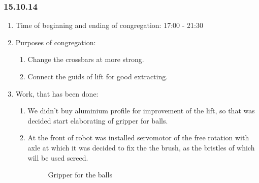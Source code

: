 
\subsubsection{15.10.14}

\begin{enumerate}
	\item Time of beginning and ending of congregation:
	17:00 - 21:30
	\item Purposes of congregation:
	\begin{enumerate}
	  \item Change the crossbars at more strong.
	  
	  \item Connect the guids of lift for good extracting.
	  
    \end{enumerate}
    
	\item Work, that has been done:
	\begin{enumerate}
	  \item We didn't buy aluminium profile for improvement of the lift, so that was decided start elaborating of gripper for balls.
      
      \item At the front of robot was installed servomotor of the free rotation with axle at which it was decided to fix the the brush, as the bristles of which will be used screed.
      
     \begin{figure}[H]
     	\begin{minipage}[h]{1\linewidth}
     		\caption{Gripper for the balls}
     	\end{minipage}
     \end{figure}
      

\end{enumerate}
\end{enumerate}
